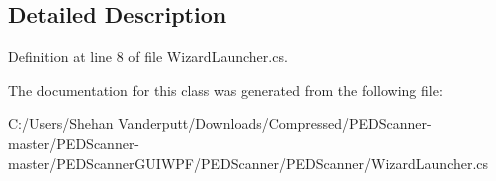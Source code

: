 \subsection{Detailed Description}


Definition at line 8 of file Wizard\+Launcher.\+cs.



The documentation for this class was generated from the following file\+:\begin{DoxyCompactItemize}
\item 
C\+:/\+Users/\+Shehan Vanderputt/\+Downloads/\+Compressed/\+P\+E\+D\+Scanner-\/master/\+P\+E\+D\+Scanner-\/master/\+P\+E\+D\+Scanner\+G\+U\+I\+W\+P\+F/\+P\+E\+D\+Scanner/\+P\+E\+D\+Scanner/Wizard\+Launcher.\+cs\end{DoxyCompactItemize}
